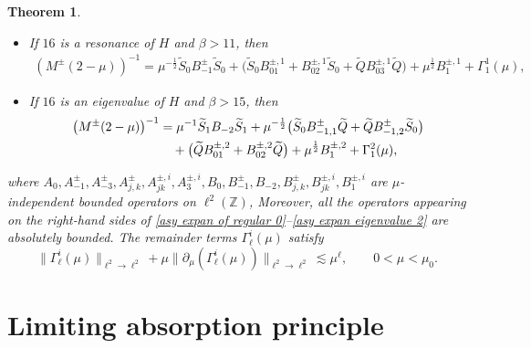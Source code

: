 \documentclass[10pt,a4paper]{amsart}
\newtheorem{theorem}[definition]{Theorem}
\newcommand\Z{\mathbb{Z}}
\numberwithin{equation}{section}
\begin{document}
\begin{theorem}
\begin{itemize}
\begin{align}
\end{align}
\item [{\rm(v)}] If $16$ is a resonance of $H$ and $\beta>11$, then
\begin{align}\label{asy expan resonance 2}
\left(M^{\pm}(2-\mu)\right)^{-1}=\mu^{-\frac{1}{2}}\widetilde{S}_0B^{\pm}_{-1}\widetilde{S}_0+\big(\widetilde{S}_0B^{\pm,1}_{01}+B^{\pm,1}_{02}\widetilde{S}_0+\widetilde{Q}B^{\pm,1}_{03}\widetilde{Q}\big)+
\mu^{\frac{1}{2}}B^{\pm,1}_1 +\Gamma^{1}_{1}(\mu),
\end{align}
\item [{\rm(vi)}] If $16$ is an eigenvalue of $H$ and $\beta>15$, then
\begin{align}\label{asy expan eigenvalue 2}
\left(M^{\pm}(2-\mu)\right)^{-1}&=\mu^{-1}\widetilde{S}_1B_{-2}\widetilde{S}_1+\mu^{-\frac{1}{2}}\big(\widetilde{S}_0B^{\pm}_{-1,1}\widetilde{Q}+\widetilde{Q}B^{\pm}_{-1,2}\widetilde{S}_0\big)\notag\\
&\quad +\big(\widetilde{Q}B^{\pm,2}_{01}+B^{\pm,2}_{02}\widetilde{Q}\big)+
\mu^{\frac{1}{2}}B^{\pm,2}_1 +\Gamma^{2}_{1}(\mu),
\end{align}
\end{itemize}
where
$A_{0},A^{\pm}_{-1},A^{\pm}_{-3},A^{\pm}_{j,k},A^{\pm,i}_{jk},A^{\pm,i}_3,B_{0},B^{\pm}_{-1},B_{-2},B^{\pm}_{j,k},B^{\pm,i}_{jk},B^{\pm,i}_{1}$ are $\mu$-independent bounded operators on $\ell^2(\Z)$, Moreover, all the operators appearing on the right-hand
sides of \eqref{asy expan of regular 0}--\eqref{asy expan eigenvalue 2}
are absolutely bounded. The remainder terms $\Gamma^{i}_\ell(\mu)$ satisfy 
\begin{equation}\label{estimate of Gamma}
\|\Gamma^{i}_{\ell}(\mu)\|_{\ell^2\rightarrow\ell^2}+\mu\big\|\partial_{\mu}(\Gamma^{i}_{\ell}(\mu))\big\|_{\ell^2\rightarrow\ell^2}\lesssim\mu^{\ell},\qquad 0<\mu<\mu_0.
\end{equation}
\end{theorem}

\setcounter{section}{1}
\section{Limiting absorption principle}\label{sec of LAP}
\end{document}
